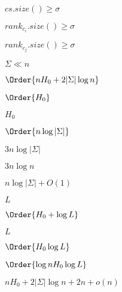 \documentclass{article}
\begin{document}
$ cs.size() \geq \sigma $
\pagebreak

$ rank_c_i.size() \geq \sigma $
\pagebreak

$ rank_c_j.size() \geq \sigma $
\pagebreak

$\Sigma \ll n$
\pagebreak

$\Order{n H_0 + 2|\Sigma|\log n}$
\pagebreak

$ \Order{H_0} $
\pagebreak

$ H_0 $
\pagebreak

$\Order{n\log|\Sigma|}$
\pagebreak

$ 3n\log|\Sigma| $
\pagebreak

$3n\log n $
\pagebreak

$ n\log|\Sigma| + O(1)$
\pagebreak

$ L $
\pagebreak

$ \Order{H_0 + \log L} $
\pagebreak

$L$
\pagebreak

$ \Order{H_0 \log L} $
\pagebreak

$ \Order{\log n H_0 \log L} $
\pagebreak

$ nH_0 + 2|\Sigma|\log n + 2n + o(n) $
\pagebreak
\end{document}
